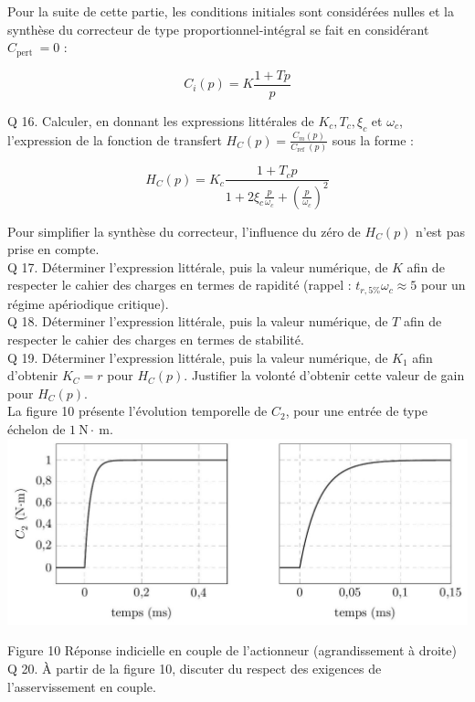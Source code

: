 \documentclass[10pt]{article}
\begin{document}
Pour la suite de cette partie, les conditions initiales sont considérées nulles et la synthèse du correcteur de type proportionnel-intégral se fait en considérant $C_{\text {pert }}=0$ :

$$
C_{i}(p)=K \frac{1+T p}{p}
$$

Q 16. Calculer, en donnant les expressions littérales de $K_{c}, T_{c}, \xi_{c}$ et $\omega_{c}$, l'expression de la fonction de transfert $H_{C}(p)=\frac{C_{m}(p)}{C_{\text {ref }}(p)}$ sous la forme :

$$
H_{C}(p)=K_{c} \frac{1+T_{c} p}{1+2 \xi_{c} \frac{p}{\omega_{c}}+\left(\frac{p}{\omega_{c}}\right)^{2}}
$$

Pour simplifier la synthèse du correcteur, l'influence du zéro de $H_{C}(p)$ n'est pas prise en compte.\\
Q 17. Déterminer l'expression littérale, puis la valeur numérique, de $K$ afin de respecter le cahier des charges en termes de rapidité (rappel : $t_{r, 5 \%} \omega_{c} \approx 5$ pour un régime apériodique critique).\\
Q 18. Déterminer l'expression littérale, puis la valeur numérique, de $T$ afin de respecter le cahier des charges en termes de stabilité.\\
Q 19. Déterminer l'expression littérale, puis la valeur numérique, de $K_{1}$ afin d'obtenir $K_{C}=r$ pour $H_{C}(p)$. Justifier la volonté d'obtenir cette valeur de gain pour $H_{C}(p)$.\\
La figure 10 présente l'évolution temporelle de $C_{2}$, pour une entrée de type échelon de $1 \mathrm{~N} \cdot \mathrm{~m}$.\\
\includegraphics[max width=\textwidth, center]{2025_07_03_97545f5dc188959e5663g-08}

Figure 10 Réponse indicielle en couple de l'actionneur (agrandissement à droite)\\
Q 20. À partir de la figure 10, discuter du respect des exigences de l'asservissement en couple.
\end{document}
